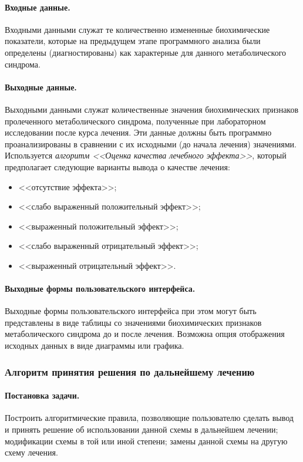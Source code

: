 \begin{multicols}{2}
      \paragraph*{Входные данные.} Входными данными служат те количественно измененные 
биохимические показатели, которые на предыдущем этапе про\-грам\-мно\-го анализа были 
определены (диагностированы) как характерные для данного метаболического синдрома. 
      
      \paragraph*{Выходные данные.} Выходными данными служат количественные значения 
биохимических признаков пролеченного метаболического синдрома, полученные при 
лабораторном исследовании после курса лечения. Эти данные должны быть про\-грам\-мно 
проанализированы в сравнении с их исходными (до начала лечения) значениями. 
Используется \textit{алгоритм <<Оценка качества лечебного эффекта>>}, который 
предполагает следующие варианты вывода о качестве лечения:
      \begin{itemize}
\item <<отсутствие эффекта>>;
\item <<слабо выраженный положительный эффект>>;
\item <<выраженный положительный эффект>>;
\item <<слабо выраженный отрицательный эффект>>; 
\item <<выраженный отрицательный эффект>>.
\end{itemize}
      
      \paragraph*{Выходные формы пользовательского интерфейса.} Выходные формы 
пользовательского интерфейса при этом могут быть представлены в виде таб\-ли\-цы со 
значениями биохимических признаков метаболического синдрома до и после лечения. 
Возможна опция отображения исходных данных в виде диаграммы или графика.

      \subsubsection*{Алгоритм принятия решения по дальнейшему лечению}
      
      \paragraph*{Постановка задачи.} Построить алгоритмические правила, позволяющие 
пользователю сделать вывод и принять решение об использовании данной схемы в 
дальнейшем лечении; модификации схемы в той или иной степени; замены данной схемы на 
другую схему лечения.
      

\end{multicols}
